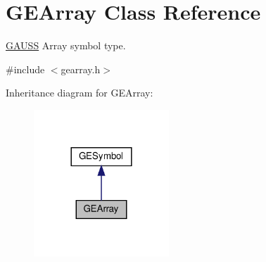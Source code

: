 \hypertarget{class_g_e_array}{}\section{G\+E\+Array Class Reference}
\label{class_g_e_array}


\hyperlink{class_g_a_u_s_s}{G\+A\+U\+SS} Array symbol type.  




{\ttfamily \#include $<$gearray.\+h$>$}



Inheritance diagram for G\+E\+Array\+:\nopagebreak
\begin{figure}[H]
\begin{center}
\leavevmode
\includegraphics[width=144pt]{class_g_e_array__inherit__graph}
\end{center}
\end{figure}
